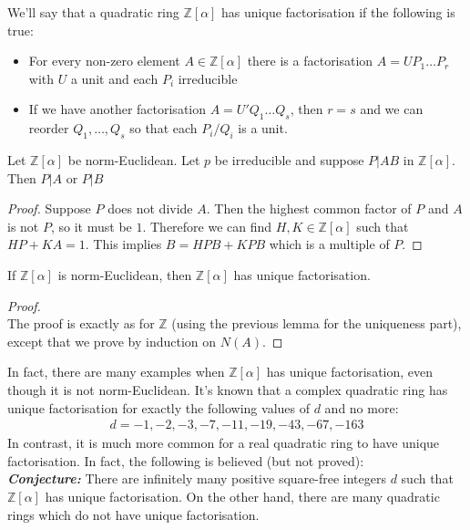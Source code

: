 \documentclass[11pt]{article}
\begin{document}
\begin{definition}
	We'll say that a quadratic ring $\mathbb{Z}[\alpha]$ has unique factorisation if the following is true:
	\begin{itemize}
		\item{For every non-zero element $A \in\mathbb{Z}[\alpha] $ there is a factorisation $A = UP_1\dots P_r $ with $U$ a unit and each $P_i$ irreducible}
		\item{If we have another factorisation $A=U'Q_1 \dots Q_s$, then $r=s$ and we can reorder $Q_1,\dots, Q_s$ so that each $P_i/Q_i$ is a unit.} 
	\end{itemize}

\end{definition}
\newpage

\begin{lemma}
	Let $\mathbb{Z}[\alpha]$ be norm-Euclidean. Let $p$ be irreducible and suppose $P|AB$ in $\mathbb{Z}[\alpha]$. Then $P|A$ or $P|B$
\end{lemma}

\begin{proof}
	Suppose $P$ does not divide $A$. Then the highest common factor of $P$ and $A$ is not $P$, so it must be $1$. Therefore we can find $H,K \in \mathbb{Z}[\alpha]$ such that $HP+KA=1$. This implies $B=HPB+KPB$ which is a multiple of $P$.
\end{proof}


\begin{theorem}
	If $\mathbb{Z}[\alpha]$ is norm-Euclidean, then $\mathbb{Z}[\alpha]$ has unique factorisation.
\end{theorem}

\begin{proof}
$ $\\
	The proof is exactly as for $\mathbb{Z}$ (using the previous lemma for the uniqueness part), except that we prove by induction on $N(A)$.
\end{proof}
In fact, there are many examples when $\mathbb{Z}[\alpha]$ has unique factorisation, even though it is not norm-Euclidean. It's known that a complex quadratic ring has unique factorisation for exactly the following values of $d$ and no more:
\begin{align*}
d=-1,-2,-3,-7,-11,-19,-43,-67,-163
\end{align*}
In contrast, it is much more common for a real quadratic ring to have unique factorisation. In fact, the following is believed (but not proved):
\\[1em]
\textit{\textbf{Conjecture:}  }There are infinitely many positive square-free integers $d$ such that $\mathbb{Z}[\alpha]$ has unique factorisation. On the other hand, there are many quadratic rings which do not have unique factorisation. \\[1em]
\end{document}
